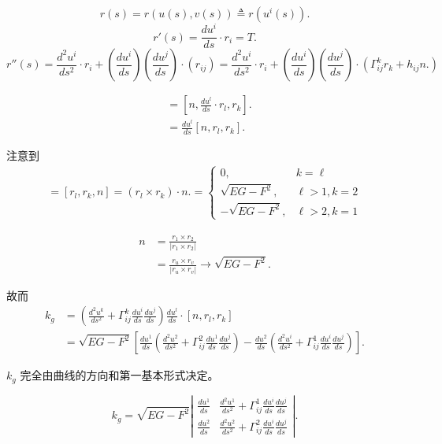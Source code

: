 \documentclass[lang=cn,10pt,thmcnt=section]{elegantbook}
\begin{document}
\[
r(s) = r(u(s), v(s)) \triangleq r(u^i(s)).
\]
\[
r'(s) = \frac{du^i}{ds} \cdot r_i = T.
\]
\[
r''(s) = \frac{d^2 u^i}{ds^2} \cdot r_i + \left( \frac{du^i}{ds} \right) \left( \frac{du^j}{ds} \right) \cdot \left( r_{ij} \right) =\frac{d^2 u^i}{ds^2} \cdot r_i + \left( \frac{du^i}{ds} \right) \left( \frac{du^j}{ds} \right) \cdot \left( \Gamma_{ij}^k r_k + h_{ij} n. \right)
\]

\begin{align*}
    [n, T, r_k] &= \left[ n, \frac{du^l}{ds} \cdot r_l, r_k \right].\\
    &= \frac{du^l}{ds} [n, r_l, r_k].
\end{align*}


注意到
\begin{align*}
    [n, r_l, r_k] = [r_l, r_k, n]= (r_l \times r_k) \cdot n.= 
    \begin{cases} 
    0, & k = \ell \\
    \sqrt{EG - F^2}, & \ell > 1, k = 2 \\
    -\sqrt{EG - F^2}, & \ell > 2, k = 1 
    \end{cases}
\end{align*}


\begin{align*}
    n &= \frac{r_1 \times r_2}{|r_1 \times r_2|}\\
    &= \frac{r_u \times r_v}{|r_u \times r_v|} \rightarrow \sqrt{EG - F^2}.
\end{align*}

故而
\begin{align*}
    k_g &= \left( \frac{d^2 u^k}{ds^2} + \Gamma_{ij}^k \frac{du^i}{ds} \frac{du^j}{ds} \right) \frac{du^l}{ds} \cdot [n, r_l, r_k] \\
    &= \sqrt{EG - F^2} \left[ \frac{du^1}{ds} \left( \frac{d^2 u^2}{ds^2} + \Gamma_{ij}^2 \frac{du^1}{ds} \frac{du^j}{ds} \right) - \frac{du^2}{ds} \left( \frac{d^2 u^i}{ds^2} + \Gamma_{ij}^1 \frac{du^i}{ds} \frac{du^j}{ds} \right) \right].
\end{align*}

\begin{theorem}
    $k_g$ 完全由曲线的方向和第一基本形式决定。

    \[
k_g = \sqrt{EG - F^2} \left| \begin{array}{cc}
\frac{du^1}{ds} & \frac{d^2 u^1}{ds^2} + \Gamma_{ij}^1 \frac{du^i}{ds} \frac{du^j}{ds} \\
\frac{du^2}{ds} & \frac{d^2 u^2}{ds^2} + \Gamma_{ij}^2 \frac{du^i}{ds} \frac{du^j}{ds}
\end{array} \right|.
\]
\end{theorem}
\end{document}
